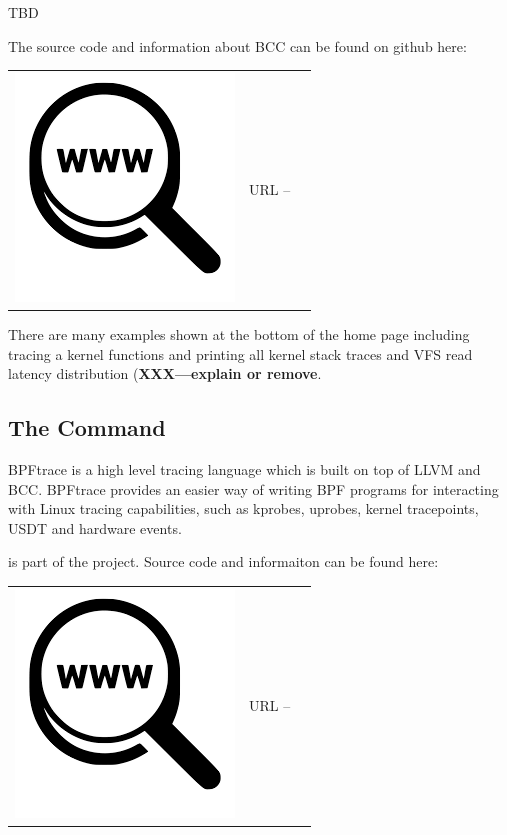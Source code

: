 TBD

The source code and information about BCC can be found on github here:

\begin{table}[h]
\begin{tabular}{lcl}
\parbox[r]{0.5in}{\includegraphics[scale=0.15]{figures/url.png}} & \parbox[l]{0.55in}{URL  -- } & \parbox[l]{3in}{}
\end{tabular}
\end{table}

\noindent
There are many examples shown at the bottom of the home page including tracing a kernel functions and printing all kernel stack traces and VFS read latency distribution (\textbf{XXX---explain or remove}.

\subsection{The  Command}

BPFtrace is a high level tracing language which is built on top of LLVM and BCC. BPFtrace provides an easier way of writing BPF programs for interacting with Linux tracing capabilities, such as kprobes, uprobes, kernel tracepoints, USDT and hardware events.

 is part of the  project. Source code and informaiton can be found here:

\begin{table}[h]
\begin{tabular}{lcl}
\parbox[r]{0.5in}{\includegraphics[scale=0.15]{figures/url.png}} & \parbox[l]{0.55in}{URL  -- } & \parbox[l]{3in}{}
\end{tabular}
\end{table}

